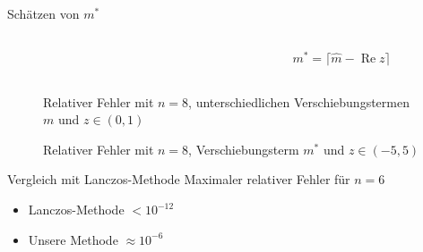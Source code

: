 \begin{frame}{Schätzen von $m^*$}
\begin{columns}
\begin{column}{0.6\textwidth}
\begin{figure}
\centering
\vspace{-24pt}
\scalebox{0.7}{}
\end{figure}
\end{column}
\begin{column}{0.39\textwidth}
\begin{align*}
m^*
=
\lceil \hat{m} - \operatorname{Re}z \rceil
\end{align*}
\end{column}
\end{columns}

\end{frame}

\begin{frame}{}
\begin{figure}[h]
\centering
\scalebox{0.6}{}
\caption{Relativer Fehler mit $n=8$, unterschiedlichen Verschiebungstermen $m$ und $z\in(0, 1)$}
\end{figure}
\end{frame}

\begin{frame}{}
\begin{figure}[h]
\centering
\scalebox{0.6}{}
\caption{Relativer Fehler mit $n=8$, Verschiebungsterm $m^*$ und $z\in(-5, 5)$}
\end{figure}
\end{frame}

\begin{frame}{Vergleich mit Lanczos-Methode}
Maximaler relativer Fehler für $n=6$
\begin{itemize}
    \item Lanczos-Methode $< 10^{-12}$
    \item Unsere Methode $\approx 10^{-6}$ 
\end{itemize}
\end{frame}